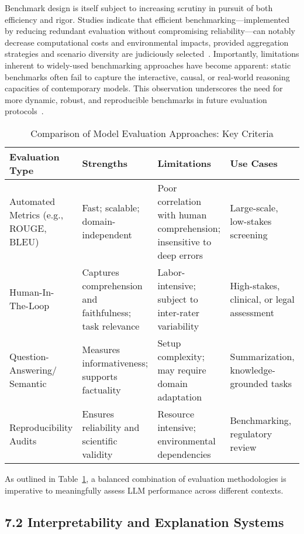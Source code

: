 \documentclass[11pt]{article}
\begin{document}
Benchmark design is itself subject to increasing scrutiny in pursuit of both efficiency and rigor. Studies indicate that efficient benchmarking—implemented by reducing redundant evaluation without compromising reliability—can notably decrease computational costs and environmental impacts, provided aggregation strategies and scenario diversity are judiciously selected~\cite{101,108}. Importantly, limitations inherent to widely-used benchmarking approaches have become apparent: static benchmarks often fail to capture the interactive, causal, or real-world reasoning capacities of contemporary models. This observation underscores the need for more dynamic, robust, and reproducible benchmarks in future evaluation protocols~\cite{76,91,104}.

\begin{table}[t]
\centering
\caption{Comparison of Model Evaluation Approaches: Key Criteria}
\label{tab:evaluation_criteria}
\begin{tabular}{|p{3cm}|p{3.5cm}|p{3.5cm}|p{3.5cm}|}
\hline
\textbf{Evaluation Type} & \textbf{Strengths} & \textbf{Limitations} & \textbf{Use Cases} \\ \hline
Automated Metrics (e.g., ROUGE, BLEU) & Fast; scalable; domain-independent & Poor correlation with human comprehension; insensitive to deep errors & Large-scale, low-stakes screening \\ \hline
Human-In-The-Loop & Captures comprehension and faithfulness; task relevance & Labor-intensive; subject to inter-rater variability & High-stakes, clinical, or legal assessment \\ \hline
Question-Answering/ Semantic & Measures informativeness; supports factuality & Setup complexity; may require domain adaptation & Summarization, knowledge-grounded tasks \\ \hline
Reproducibility Audits & Ensures reliability and scientific validity & Resource intensive; environmental dependencies & Benchmarking, regulatory review \\ \hline
\end{tabular}
\end{table}

As outlined in Table~\ref{tab:evaluation_criteria}, a balanced combination of evaluation methodologies is imperative to meaningfully assess LLM performance across different contexts.

\subsection{7.2 Interpretability and Explanation Systems}
\end{document}
